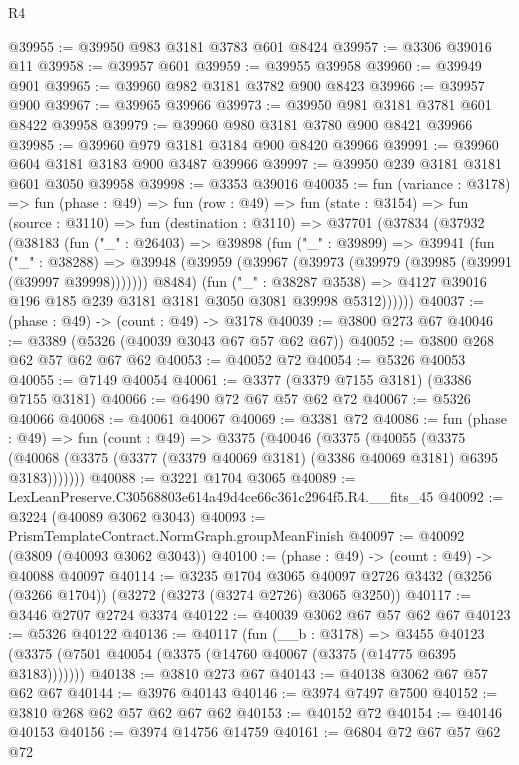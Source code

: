 \begin{lexlean}{R4}
\begin{coremodule}
@39955 := @39950 @983 @3181 @3783 @601 @8424
@39957 := @3306 @39016 @11
@39958 := @39957 @601
@39959 := @39955 @39958
@39960 := @39949 @901
@39965 := @39960 @982 @3181 @3782 @900 @8423
@39966 := @39957 @900
@39967 := @39965 @39966
@39973 := @39950 @981 @3181 @3781 @601 @8422 @39958
@39979 := @39960 @980 @3181 @3780 @900 @8421 @39966
@39985 := @39960 @979 @3181 @3184 @900 @8420 @39966
@39991 := @39960 @604 @3181 @3183 @900 @3487 @39966
@39997 := @39950 @239 @3181 @3181 @601 @3050 @39958
@39998 := @3353 @39016
@40035 := fun (variance : @3178) =>
  fun (phase : @49) =>
  fun (row : @49) =>
  fun (state : @3154) =>
  fun (source : @3110) =>
  fun (destination : @3110) =>
  @37701
    (@37834
      (@37932
        (@38183
          (fun ("_" : @26403) =>
          @39898
            (fun ("_" : @39899) =>
            @39941
              (fun ("_" : @38288) =>
              @39948 (@39959 (@39967 (@39973 (@39979 (@39985 (@39991 (@39997 @39998))))))) @8484)
              (fun ("_" : @38287 @3538) =>
              @4127 @39016 @196 @185 @239 @3181 @3181 @3050 @3081 @39998 @5312))))))
@40037 := (phase : @49) -> (count : @49) -> @3178
@40039 := @3800 @273 @67
@40046 := @3389 (@5326 (@40039 @3043 @67 @57 @62 @67))
@40052 := @3800 @268 @62 @57 @62 @67 @62
@40053 := @40052 @72
@40054 := @5326 @40053
@40055 := @7149 @40054
@40061 := @3377 (@3379 @7155 @3181) (@3386 @7155 @3181)
@40066 := @6490 @72 @67 @57 @62 @72
@40067 := @5326 @40066
@40068 := @40061 @40067
@40069 := @3381 @72
@40086 := fun (phase : @49) =>
  fun (count : @49) =>
  @3375
    (@40046
      (@3375
        (@40055
          (@3375 (@40068 (@3375 (@3377 (@3379 @40069 @3181) (@3386 @40069 @3181) @6395 @3183)))))))
@40088 := @3221 @1704 @3065
@40089 := LexLeanPreserve.C30568803e614a49d4ce66c361c2964f5.R4.__fits_45
@40092 := @3224 (@40089 @3062 @3043)
@40093 := PrismTemplateContract.NormGraph.groupMeanFinish
@40097 := @40092 (@3809 (@40093 @3062 @3043))
@40100 := (phase : @49) -> (count : @49) -> @40088 @40097
@40114 := @3235
    @1704
    @3065
    @40097
    @2726
    @3432
    (@3256 (@3266 @1704))
    (@3272 (@3273 (@3274 @2726) @3065 @3250))
@40117 := @3446 @2707 @2724 @3374
@40122 := @40039 @3062 @67 @57 @62 @67
@40123 := @5326 @40122
@40136 := @40117
    (fun (__b : @3178) =>
    @3455 @40123 (@3375 (@7501 @40054 (@3375 (@14760 @40067 (@3375 (@14775 @6395 @3183)))))))
@40138 := @3810 @273 @67
@40143 := @40138 @3062 @67 @57 @62 @67
@40144 := @3976 @40143
@40146 := @3974 @7497 @7500
@40152 := @3810 @268 @62 @57 @62 @67 @62
@40153 := @40152 @72
@40154 := @40146 @40153
@40156 := @3974 @14756 @14759
@40161 := @6804 @72 @67 @57 @62 @72

\end{coremodule}
\end{lexlean}

